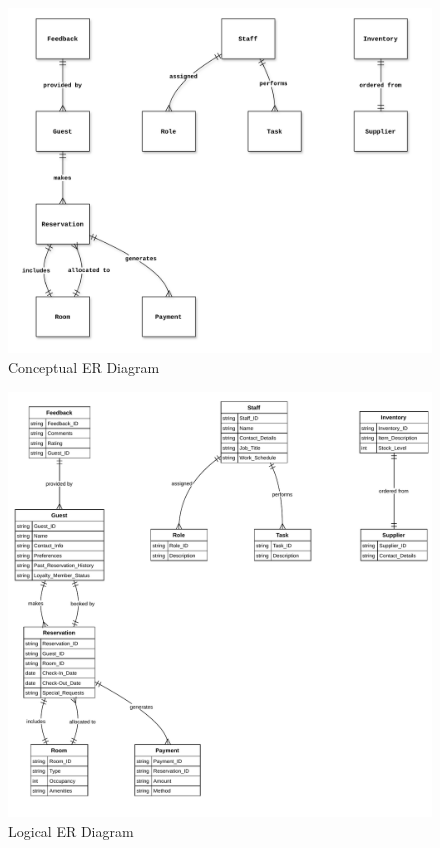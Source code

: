 \documentclass{article}
\begin{document}
\begin{figure}[h]
\centering
\includegraphics[width=\textwidth]{Conceptuat-ERD.pdf}
\caption{Conceptual ER Diagram}
\end{figure}

\begin{figure}[h]
\centering
\includegraphics[width=\textwidth]{Logical-ERD.pdf}
\caption{Logical ER Diagram}
\end{figure}
\end{document}
